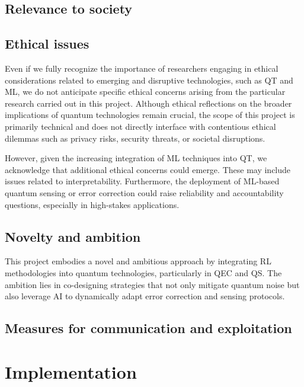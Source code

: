 \documentclass{scrreprt}
\begin{document}
\subsection{Relevance to society}


\subsection{Ethical issues}

Even if we fully recognize the importance of researchers engaging in
ethical considerations related to emerging and disruptive
technologies, such as QT and ML, we do not anticipate specific ethical
concerns arising from the particular research carried out in this
project. Although ethical reflections on the broader implications of
quantum technologies remain crucial, the scope of this project is
primarily technical and does not directly interface with contentious
ethical dilemmas such as privacy risks, security threats, or societal
disruptions.

However, given the increasing integration of ML techniques into QT, we
acknowledge that additional ethical concerns could emerge. These may
include issues related to interpretability. Furthermore, the
deployment of ML-based quantum sensing or error correction could raise
reliability and accountability questions, especially in high-stakes
applications.




\subsection{Novelty and ambition}

This project embodies a novel and ambitious approach by integrating RL
methodologies into quantum technologies, particularly in QEC and
QS. The ambition lies in co-designing strategies that not only
mitigate quantum noise but also leverage AI to dynamically adapt error
correction and sensing protocols.

  
\subsection{Measures for communication and exploitation}



\section{Implementation}
\end{document}
